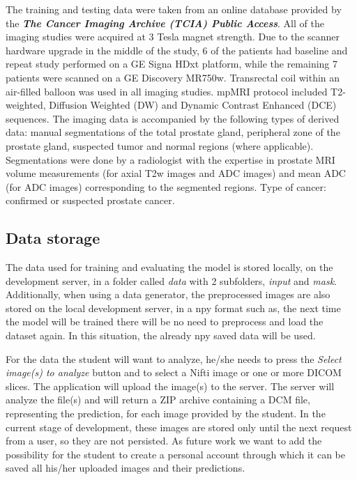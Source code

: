 \documentclass[runningheads,a4paper,11pt]{report}
\begin{document}
The training and testing data were taken from an online database provided by the \textbf{\textit{The Cancer Imaging Archive (TCIA) Public Access}}. All of the imaging studies were acquired at 3 Tesla magnet strength. Due to the scanner hardware upgrade in the middle of the study, 6 of the patients had baseline and repeat study performed on a GE Signa HDxt platform, while the remaining 7 patients were scanned on a GE Discovery MR750w. Transrectal coil within an air-filled balloon was used in all imaging studies. mpMRI protocol included T2-weighted, Diffusion Weighted (DW) and Dynamic Contrast Enhanced (DCE) sequences.
The imaging data is accompanied by the following types of derived data: manual segmentations of the total prostate gland, peripheral zone of the prostate gland, suspected tumor and normal regions (where applicable). Segmentations were done by a radiologist with the expertise in prostate MRI
volume measurements (for axial T2w images and ADC images) and mean ADC (for ADC images) corresponding to the segmented regions. Type of cancer: confirmed or suspected prostate cancer.\cite{dataset}

\subsection{Data storage}
\label{section:data_storage}

The data used for training and evaluating the model is stored locally, on the development server, in a folder called \emph{data} with 2 subfolders, \emph{input} and \emph{mask}. Additionally, when using a data generator, the preprocessed images are also stored on the local development server, in a npy format such as, the next time the model will be trained there will be no need to preprocess and load the dataset again. In this situation, the already npy saved data will be used.\par
For the data the student will want to analyze, he/she needs to press the \emph{Select image(s) to analyze} button and to select a Nifti image or one or more DICOM slices. The application will upload the image(s) to the server. The server will analyze the file(s) and will return a ZIP archive containing a DCM file, representing the prediction, for each image provided by the student.
In the current stage of development, these images are stored only until the next request from a user, so they are not persisted. As future work we want to add the possibility for the student to create a personal account through which it can be saved all his/her uploaded images and their predictions.
\end{document}
